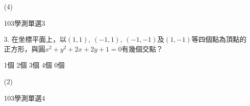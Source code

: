 \begin{QUESTIONS}
\begin{QUESTION}
\begin{QFROMS}
        \end{QFROMS}
        \begin{QTAGS}\end{QTAGS}
        \begin{QANS}
            (4)
        \end{QANS}
        \begin{QSOLLIST}
        \end{QSOLLIST}
        \begin{QEMPTYSPACE}
        \end{QEMPTYSPACE}
    \end{QUESTION}
    \begin{QUESTION}
        \begin{ExamInfo}{103}{學測}{單選}{3}
        \end{ExamInfo}
        \begin{ExamAnsRateInfo}{73}{96}{86}{37}
        \end{ExamAnsRateInfo}
        \begin{QBODY}
            3.	在坐標平面上，以$(1,1),\ (-1,1),\ (-1,-1)$及$(1,-1)$等四個點為頂點的正方形，與圓${{x}^{2}}+{{y}^{2}}+2x+2y+1=0$有幾個交點？
			\begin{QOPS}
				\QOP 1個
				\QOP 2個
				\QOP 3個
				\QOP 4個
				\QOP 0個
			\end{QOPS}
        \end{QBODY}
        \begin{QFROMS}
        \end{QFROMS}
        \begin{QTAGS}\end{QTAGS}
        \begin{QANS}
            (2)
        \end{QANS}
        \begin{QSOLLIST}
        \end{QSOLLIST}
        \begin{QEMPTYSPACE}
        \end{QEMPTYSPACE}
    \end{QUESTION}
    \begin{QUESTION}
        \begin{ExamInfo}{103}{學測}{單選}{4}
        \end{ExamInfo}
        \begin{ExamAnsRateInfo}{68}{95}{79}{30}
        \end{ExamAnsRateInfo}
        \begin{QBODY}

\end{QBODY}
\end{QUESTION}
\end{QUESTIONS}

